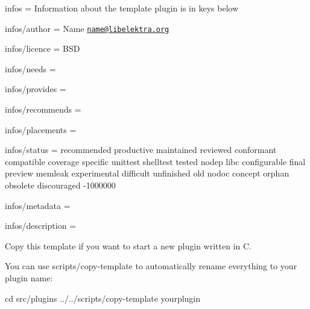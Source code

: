 
\begin{DoxyItemize}
\item infos = Information about the template plugin is in keys below
\item infos/author = Name \href{mailto:name@libelektra.org}{\tt name@libelektra.\+org}
\item infos/licence = B\+S\+D
\item infos/needs =
\item infos/provides =
\item infos/recommends =
\item infos/placements =
\item infos/status = recommended productive maintained reviewed conformant compatible coverage specific unittest shelltest tested nodep libc configurable final preview memleak experimental difficult unfinished old nodoc concept orphan obsolete discouraged -\/1000000
\item infos/metadata =
\item infos/description =
\end{DoxyItemize}

Copy this template if you want to start a new plugin written in C.

You can use scripts/copy-\/template to automatically rename everything to your plugin name\+: \begin{DoxyVerb}    cd src/plugins
    ../../scripts/copy-template yourplugin\end{DoxyVerb}
 